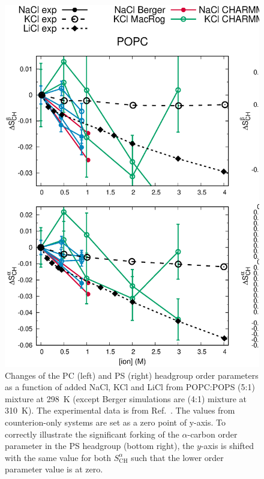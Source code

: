 \documentclass[journal=jpcbfk,manuscript=article]{achemso}
\begin{document}
\begin{figure}[]
  \centering
  \includegraphics[width=1.02\textwidth]{../Figs/CHANGESwithMONVALENTwithPS.eps}
  \caption{\label{PSresponseTONaCl}
    Changes of the PC (left) and PS (right) headgroup order parameters as a function of
    added NaCl, KCl and LiCl from POPC:POPS (5:1) mixture at 298~K
    (except Berger simulations are (4:1) mixture at 310~K).
    The experimental data is from Ref.~.
    The values from counterion-only systems are set as a zero point of y-axis.
    To correctly illustrate the significant forking of the $\alpha$-carbon order parameter
    in the PS headgroup (bottom right), the $y$-axis is shifted with the same value for both $S^\alpha_\mathrm{CH}$ such that the lower order
    parameter value is at zero.
  }
\end{figure}
\end{document}
